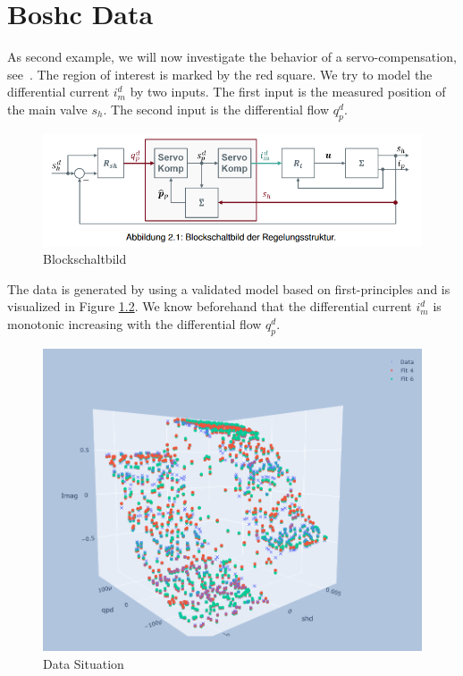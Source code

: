 \chapter{Boshc Data} \label{cha:real-world-application2}

As second example, we will now investigate the behavior of a servo-compensation, see~. The region of interest is marked by the red square. We try to model the differential current $i_m^d$ by two inputs. The first input is the measured position of the main valve $s_h$. The second input is the differential flow $q_p^d$. 

\begin{figure}[H]
	\centering
	\includegraphics[width=0.8\columnwidth]{graphics/pgfplots/chaBosch/blockschaltbild.png}
	\caption{Blockschaltbild}
	\label{fig:blockschaltbild}
\end{figure}

The data is generated by using a validated model based on first-principles and is visualized in Figure \ref{fig:bosch_data_situation}. We know beforehand that the differential current $i_m^d$ is monotonic increasing with the differential flow $q_p^d$. 

\begin{figure}[H]
	\centering
	\includegraphics[width=0.8\columnwidth]{graphics/pgfplots/chaBosch/data_situation.png}
	\caption{Data Situation}
	\label{fig:bosch_data_situation}
\end{figure}

